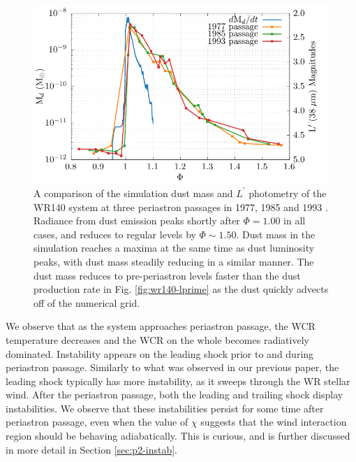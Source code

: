 \documentclass[fleqn,usenatbib]{mnras}
\begin{document}
\begin{figure}
  \centering
  \includegraphics[width=\linewidth]{assets/fluxes/magnitudes-mass.pdf}
  \caption[Comparison of simulation dust mass and $L^\prime$ photometry]{A comparison of the simulation dust mass and $L^\prime$ photometry of the WR140 system at three periastron passages in 1977, 1985 and 1993 \citep{crowther_dust_2003}. Radiance from dust emission peaks shortly after $\Phi = 1.00$ in all cases, and reduces to regular levels by $\Phi \sim 1.50$. Dust mass in the simulation reaches a maxima at the same time as dust luminosity peaks, with dust mass steadily reducing in a similar manner. The dust mass reduces to pre-periastron levels faster than the dust production rate in Fig. \ref{fig:wr140-lprime} as the dust quickly advects off of the numerical grid.}
  \label{fig:wr140-lprime-mass}
\end{figure}

We observe that as the system approaches periastron passage, the WCR temperature decreases and the WCR on the whole becomes radiatively dominated.
Instability appears on the leading shock prior to and during periastron passage.
Similarly to what was observed in our previous paper, the leading shock typically has more instability, as it sweeps through the WR stellar wind.
After the periastron passage, both the leading and trailing shock display instabilities.
We observe that these instabilities persist for some time after periastron passage, even when the value of $\chi$ suggests that the wind interaction region should be behaving adiabatically.
This is curious, and is further discussed in more detail in Section \ref{sec:p2-instab}.
\end{document}
